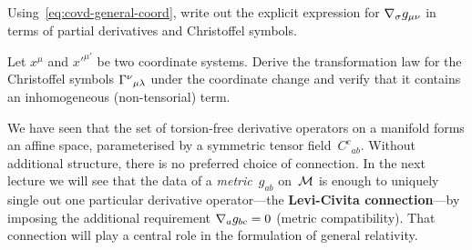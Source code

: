 \begin{exercise}\label{ex:covd-metric-components}
  Using~\eqref{eq:covd-general-coord}, write out the
  explicit expression for $\nabla_\sigma g_{\mu\nu}$ in terms
  of partial derivatives and Christoffel symbols.
\end{exercise}

\begin{exercise}\label{ex:christoffel-not-tensor}
  Let $x^\mu$ and $x'^{\mu'}$ be two coordinate systems.
  Derive the transformation law for the Christoffel symbols
  $\Gamma^{\nu}{}_{\mu\lambda}$ under the coordinate change and
  verify that it contains an inhomogeneous (non-tensorial) term.
\end{exercise}

\medskip
We have seen that the set of torsion-free derivative operators on
a manifold forms an affine space, parameterised by a symmetric
tensor field~$C^c{}_{ab}$.  Without additional structure, there
is no preferred choice of connection.  In the next lecture we
will see that the data of a \emph{metric}~$g_{ab}$ on~$\mathcal{M}$ is
enough to uniquely single out one particular derivative
operator---the \textbf{Levi-Civita connection}---by imposing
the additional requirement $\nabla_a g_{bc} = 0$ (metric
compatibility).  That connection will play a central role in the
formulation of general relativity.
